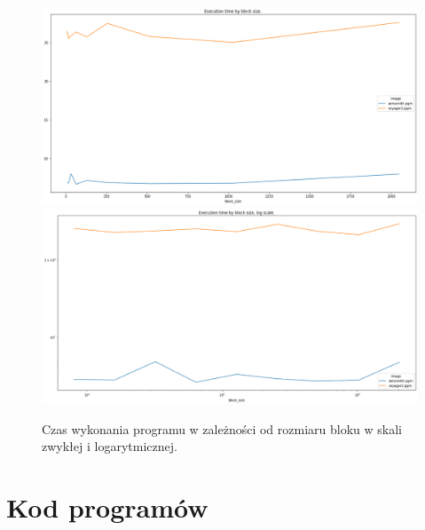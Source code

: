 \documentclass{article}
\begin{document}
        \begin{figure}[htb]
            \centering
            \includegraphics[width=\textwidth]{cuda/Lab2/report/images/image_by_block_size.png}
            \includegraphics[width=\textwidth]{cuda/Lab2/report/images/image_by_block_size_log.png}
            \caption{Czas wykonania programu w zależności od rozmiaru bloku w skali zwykłej i logarytmicznej.}
        \end{figure}

    \clearpage
    \section{Kod programów}
        
        
        
\end{document}
